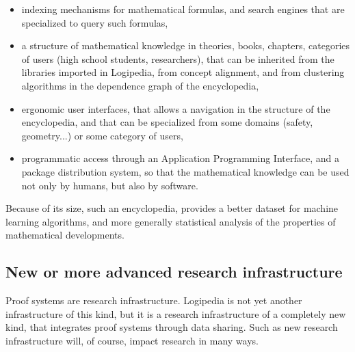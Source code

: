 \begin{itemize}
\item indexing mechanisms for mathematical formulas, and search engines
  that are specialized to query such formulas,

  \item a structure of mathematical knowledge in theories, books,
    chapters, categories of users (high school students, researchers),
    that can be inherited from the libraries imported in 
      Logipedia, from concept alignment, and from clustering
    algorithms in the dependence graph of the encyclopedia,

  \item ergonomic user interfaces, that allows a navigation in the
    structure of the encyclopedia, and that can be specialized from
    some domains (safety, geometry...) or some category of users,

  \item programmatic access through an Application Programming
    Interface, and a package distribution system, so that the
    mathematical knowledge can be used not only by humans, but also by
    software.
\end{itemize}

Because of its size, such an encyclopedia, provides a better dataset
for machine learning algorithms, and more generally statistical
analysis of the properties of mathematical developments.

\subsection{New or more advanced research infrastructure}

Proof systems are research infrastructure. Logipedia is not yet
another infrastructure of this kind, but it is a research
infrastructure of a completely new kind, that integrates proof systems
through data sharing.  Such as new research infrastructure will, of
course, impact research in many ways.

